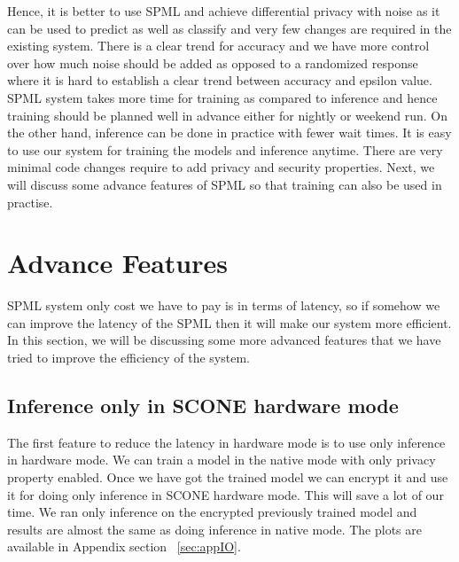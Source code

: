 Hence, it is better to use SPML and achieve differential privacy with noise as it can be used to predict as well as classify and very few changes are required in the existing system. There is a clear trend for accuracy and we have more control over how much noise should be added as opposed to a randomized response where it is hard to establish a clear trend between accuracy and epsilon value. SPML system takes more time for training as compared to inference and hence training should be planned well in advance either for nightly or weekend run. On the other hand, inference can be done in practice with fewer wait times. It is easy to use our system for training the models and inference anytime. There are very minimal code changes require to add privacy and security properties. Next, we will discuss some advance features of SPML so that training can also be used in practise.

\section{Advance Features}
SPML system only cost we have to pay is in terms of latency, so if somehow we can improve the latency of the SPML then it will make our system more efficient. In this section, we will be discussing some more advanced features that we have tried to improve the efficiency of the system.

\subsection{Inference only in SCONE hardware mode}
\label{sec:ioonly}
The first feature to reduce the latency in hardware mode is to use only inference in hardware mode. We can train a model in the native mode with only privacy property enabled. Once we have got the trained model we can encrypt it and use it for doing only inference in SCONE hardware mode. This will save a lot of our time. We ran only inference on the encrypted previously trained model and results are almost the same as doing inference in native mode. The plots are available in Appendix section ~\ref{sec:appIO}.

